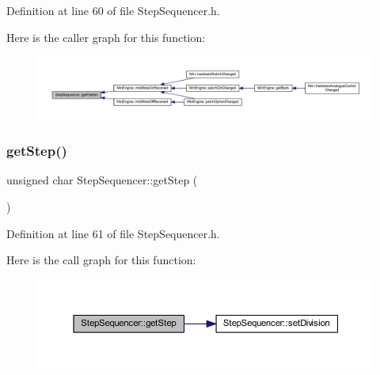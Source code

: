 Definition at line 60 of file Step\+Sequencer.\+h.

Here is the caller graph for this function\+:
\nopagebreak
\begin{figure}[H]
\begin{center}
\leavevmode
\includegraphics[width=350pt]{dc/d87/class_step_sequencer_a6c3987d5f4a966e8fcde3f7926aca54e_icgraph}
\end{center}
\end{figure}
\mbox{\label{class_step_sequencer_ad00472eb91462892049d5e4757e29af3}} 
\subsubsection{\texorpdfstring{get\+Step()}{getStep()}}
{\footnotesize\ttfamily unsigned char Step\+Sequencer\+::get\+Step (\begin{DoxyParamCaption}{ }\end{DoxyParamCaption})\hspace{0.3cm}{\ttfamily [inline]}}



Definition at line 61 of file Step\+Sequencer.\+h.

Here is the call graph for this function\+:
\nopagebreak
\begin{figure}[H]
\begin{center}
\leavevmode
\includegraphics[width=350pt]{dc/d87/class_step_sequencer_ad00472eb91462892049d5e4757e29af3_cgraph}
\end{center}
\end{figure}
\mbox{\label{class_step_sequencer_a706e6a91c6b3ccd606876f57c334b311}} 
